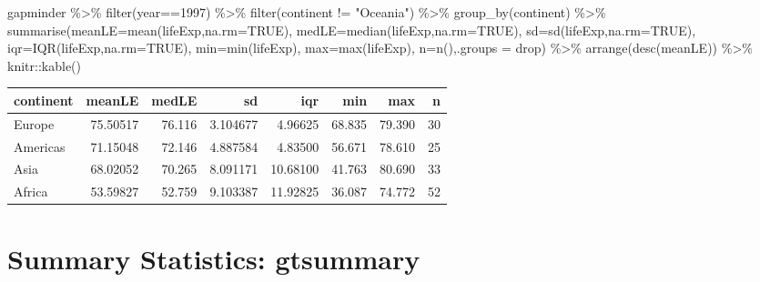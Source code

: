 \documentclass[
]{book}
\newenvironment{Shaded}{\begin{snugshade}}{\end{snugshade}}
\newcommand{\AttributeTok}[1]{\textcolor[rgb]{0.77,0.63,0.00}{#1}}
\newcommand{\ConstantTok}[1]{\textcolor[rgb]{0.00,0.00,0.00}{#1}}
\newcommand{\DecValTok}[1]{\textcolor[rgb]{0.00,0.00,0.81}{#1}}
\newcommand{\FunctionTok}[1]{\textcolor[rgb]{0.00,0.00,0.00}{#1}}
\newcommand{\NormalTok}[1]{#1}
\newcommand{\SpecialCharTok}[1]{\textcolor[rgb]{0.00,0.00,0.00}{#1}}
\newcommand{\StringTok}[1]{\textcolor[rgb]{0.31,0.60,0.02}{#1}}
\begin{document}
\begin{Shaded}
\begin{Highlighting}[]
\NormalTok{gapminder }\SpecialCharTok{\%\textgreater{}\%} \FunctionTok{filter}\NormalTok{(year}\SpecialCharTok{==}\DecValTok{1997}\NormalTok{) }\SpecialCharTok{\%\textgreater{}\%} 
  \FunctionTok{filter}\NormalTok{(continent }\SpecialCharTok{!=} \StringTok{"Oceania"}\NormalTok{) }\SpecialCharTok{\%\textgreater{}\%} 
  \FunctionTok{group\_by}\NormalTok{(continent) }\SpecialCharTok{\%\textgreater{}\%} 
  \FunctionTok{summarise}\NormalTok{(}\AttributeTok{meanLE=}\FunctionTok{mean}\NormalTok{(lifeExp,}\AttributeTok{na.rm=}\ConstantTok{TRUE}\NormalTok{),}
            \AttributeTok{medLE=}\FunctionTok{median}\NormalTok{(lifeExp,}\AttributeTok{na.rm=}\ConstantTok{TRUE}\NormalTok{),}
            \AttributeTok{sd=}\FunctionTok{sd}\NormalTok{(lifeExp,}\AttributeTok{na.rm=}\ConstantTok{TRUE}\NormalTok{),}
            \AttributeTok{iqr=}\FunctionTok{IQR}\NormalTok{(lifeExp,}\AttributeTok{na.rm=}\ConstantTok{TRUE}\NormalTok{),}
            \AttributeTok{min=}\FunctionTok{min}\NormalTok{(lifeExp),}
            \AttributeTok{max=}\FunctionTok{max}\NormalTok{(lifeExp),}
            \AttributeTok{n=}\FunctionTok{n}\NormalTok{(),}\AttributeTok{.groups =} \StringTok{\textquotesingle{}drop\textquotesingle{}}\NormalTok{)  }\SpecialCharTok{\%\textgreater{}\%} 
  \FunctionTok{arrange}\NormalTok{(}\FunctionTok{desc}\NormalTok{(meanLE)) }\SpecialCharTok{\%\textgreater{}\%}
\NormalTok{  knitr}\SpecialCharTok{::}\FunctionTok{kable}\NormalTok{()}
\end{Highlighting}
\end{Shaded}

\begin{tabular}{l|r|r|r|r|r|r|r}
\hline
continent & meanLE & medLE & sd & iqr & min & max & n\\
\hline
Europe & 75.50517 & 76.116 & 3.104677 & 4.96625 & 68.835 & 79.390 & 30\\
\hline
Americas & 71.15048 & 72.146 & 4.887584 & 4.83500 & 56.671 & 78.610 & 25\\
\hline
Asia & 68.02052 & 70.265 & 8.091171 & 10.68100 & 41.763 & 80.690 & 33\\
\hline
Africa & 53.59827 & 52.759 & 9.103387 & 11.92825 & 36.087 & 74.772 & 52\\
\hline
\end{tabular}

\hypertarget{summary-statistics-gtsummary}{%
\section{Summary Statistics: gtsummary}\label{summary-statistics-gtsummary}}
\end{document}

